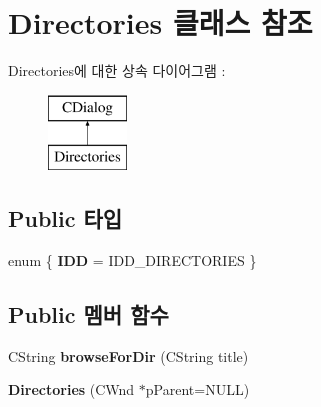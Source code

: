 \hypertarget{class_directories}{}\section{Directories 클래스 참조}
\label{class_directories}
Directories에 대한 상속 다이어그램 \+: \begin{figure}[H]
\begin{center}
\leavevmode
\includegraphics[height=2.000000cm]{class_directories}
\end{center}
\end{figure}
\subsection*{Public 타입}
\begin{DoxyCompactItemize}
\item 
\mbox{\label{class_directories_af0d05207ae8fd4572edf7950c207d6c0}} 
enum \{ {\bfseries I\+DD} = I\+D\+D\+\_\+\+D\+I\+R\+E\+C\+T\+O\+R\+I\+ES
 \}
\end{DoxyCompactItemize}
\subsection*{Public 멤버 함수}
\begin{DoxyCompactItemize}
\item 
\mbox{\label{class_directories_a7e24bf265fe6af9c01e0939952c337e1}} 
C\+String {\bfseries browse\+For\+Dir} (C\+String title)
\item 
\mbox{\label{class_directories_a03ef542d611759b1b619742e0bde92e7}} 
{\bfseries Directories} (C\+Wnd $\ast$p\+Parent=N\+U\+LL)
\end{DoxyCompactItemize}
